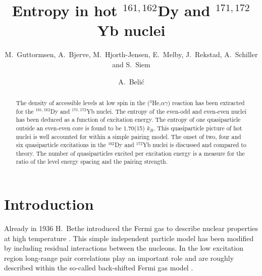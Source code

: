 
\draft



\title{Entropy in hot $^{161,162}$Dy and $^{171,172}$Yb nuclei}

\author{M.~Guttormsen, A.~Bjerve, M.~Hjorth-Jensen, E.~Melby, J.~Rekstad, A.~Schiller and S.~Siem}

\address{Department of Physics, University of Oslo, N-0316 Oslo, Norway}

\author{A.~Beli\'c}

\address{Institute of Physics, P.O.B. 57,Belgrade 11001, Yugoslavia}

\maketitle

\begin{abstract}

The density of accessible levels at low spin in the ($^3$He,$\alpha \gamma$) reaction has been extracted for the $^{161,162}$Dy and $^{171,172}$Yb nuclei. The entropy of the even-odd and even-even nuclei has been deduced as a function of excitation energy.
The entropy of one quasiparticle outside an even-even core is found to be 1.70(15) $k_B$. This quasiparticle picture of hot nuclei is well accounted for within a simple pairing model. The onset of two, four and six quasiparticle excitations in the $^{162}$Dy and $^{172}$Yb nuclei is discussed and compared to theory. The number of quasiparticles excited per excitation energy is a measure for the ratio of the level energy spacing and the pairing strength. 

\end{abstract}



\section{Introduction}

Already in 1936 H.~Bethe introduced the Fermi gas to describe nuclear properties at high temperature \cite{1}. This simple independent particle model has been modified by including residual interactions between the nucleons. In the low excitation region long-range pair correlations play an important role and are roughly described within the so-called back-shifted Fermi gas model \cite{2}.

